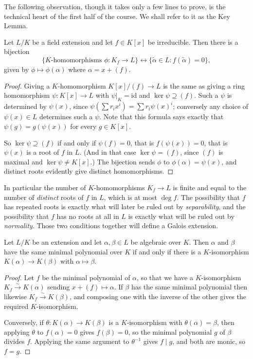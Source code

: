 The following observation, though it takes only a few lines to prove, is the technical heart of the first half of the course. We shall refer to it as the Key Lemma.

\begin{lemma}\label{lem:key}
	Let $L/K$ be a field extension and let $f \in K[x]$ be irreducible. Then there is a bijection
	$$\{K\text{-homomorphisms } \phi : K_f \to L\} \longleftrightarrow \{\tilde\alpha \in L : f(\tilde\alpha) = 0\},$$
	given by $\phi \mapsto \phi(\alpha)$ where $\alpha = x + (f)$.
\end{lemma}

\begin{proof}
	Giving a $K$-homomorphism $K[x]/(f) \to L$ is the same as giving a ring homomorphism $\psi : K[x] \to L$ with $\psi|_K = \mathrm{id}$ and $\ker \psi \supseteq (f)$. Such a $\psi$ is determined by $\psi(x)$, since $\psi(\sum r_i x^i) = \sum r_i \psi(x)^i$; conversely any choice of $\psi(x) \in L$ determines such a $\psi$. Note that this formula says exactly that $\psi(g) = g(\psi(x))$ for every $g \in K[x]$.

	So $\ker\psi \supseteq (f)$ if and only if $\psi(f) = 0$, that is $f(\psi(x)) = 0$, that is $\psi(x)$ is a root of $f$ in $L$. (And in that case $\ker\psi = (f)$, since $(f)$ is maximal and $\ker \psi \neq K[x]$.) The bijection sends $\phi$ to $\phi(\alpha) = \psi(x)$, and distinct roots evidently give distinct homomorphisms.
\end{proof}

In particular the number of $K$-homomorphisms $K_f \to L$ is finite and equal to the number of \emph{distinct} roots of $f$ in $L$, which is at most $\deg f$. The possibility that $f$ has repeated roots is exactly what will later be ruled out by \emph{separability}, and the possibility that $f$ has no roots at all in $L$ is exactly what will be ruled out by \emph{normality}. Those two conditions together will define a Galois extension.

\begin{corollary}\label{cor:sameminpoly}
	Let $L/K$ be an extension and let $\alpha, \beta \in L$ be algebraic over $K$. Then $\alpha$ and $\beta$ have the same minimal polynomial over $K$ if and only if there is a $K$-isomorphism $K(\alpha) \to K(\beta)$ with $\alpha \mapsto \beta$.
\end{corollary}

\begin{proof}
	Let $f$ be the minimal polynomial of $\alpha$, so that we have a $K$-isomorphism $K_f \xrightarrow{\sim} K(\alpha)$ sending $x + (f) \mapsto \alpha$. If $\beta$ has the same minimal polynomial then likewise $K_f \xrightarrow{\sim} K(\beta)$, and composing one with the inverse of the other gives the required $K$-isomorphism.

	Conversely, if $\theta : K(\alpha) \to K(\beta)$ is a $K$-isomorphism with $\theta(\alpha) = \beta$, then applying $\theta$ to $f(\alpha) = 0$ gives $f(\beta) = 0$, so the minimal polynomial $g$ of $\beta$ divides $f$. Applying the same argument to $\theta^{-1}$ gives $f \mid g$, and both are monic, so $f = g$.
\end{proof}

